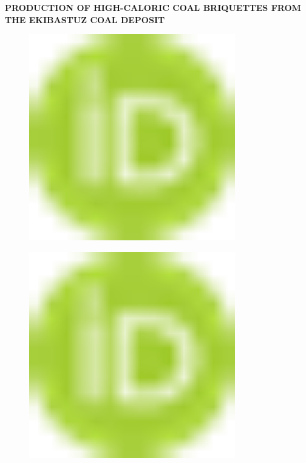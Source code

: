 
{\bfseries PRODUCTION OF HIGH-CALORIC COAL BRIQUETTES FROM THE EKIBASTUZ
COAL DEPOSIT}

\begin{figure}[H]
	\centering
	\includegraphics[width=0.8\textwidth]{media/gorn2/image1}
	\caption*{}
\end{figure}

\begin{figure}[H]
	\centering
	\includegraphics[width=0.8\textwidth]{media/gorn2/image1}
	\caption*{}
\end{figure}

